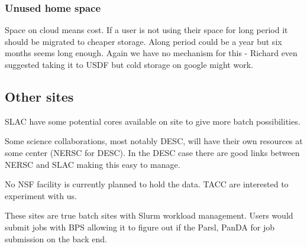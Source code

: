 \subsubsection{Unused home space}
Space on cloud means cost.
If a  user is not using their space for long period it should be migrated to cheaper storage.
Along period could be  a year but six months seems long enough.
Again we have no mechanism for this - Richard even suggested taking it to USDF but cold storage on google might work.



\subsection{Other sites}\label{sec:othersites}
SLAC have some potential cores available on site to give more batch possibilities.

Some science collaborations, most notably DESC, will have their own resources at some center (NERSC for DESC).  In the DESC case there are good links between NERSC and SLAC making this easy to manage.

No NSF facility is currently planned to hold the data. TACC are interested to experiment with us.

These sites are true batch sites with Slurm workload management. Users would submit jobs with BPS
allowing it to figure out if the Parsl, PanDA for job submission on the back end.


